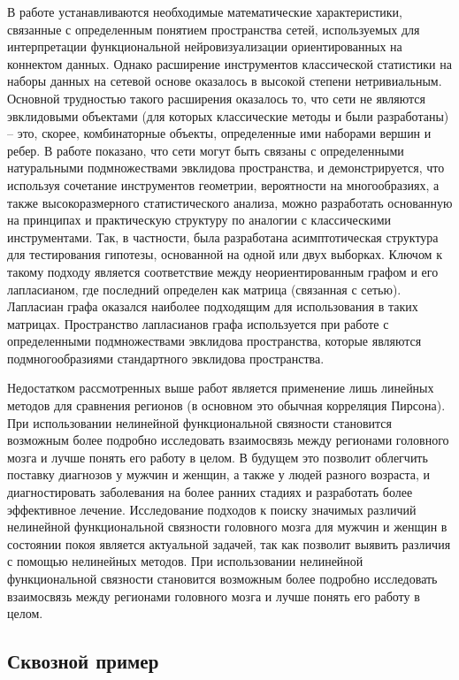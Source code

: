 В работе \cite{ginestet2017hypothesis} устанавливаются необходимые математические характеристики, связанные с определенным понятием пространства сетей, используемых для интерпретации функциональной нейровизуализации ориентированных на коннектом данных. Однако расширение инструментов классической статистики на наборы данных на сетевой основе оказалось в высокой степени нетривиальным. Основной трудностью такого расширения оказалось то, что сети не являются эвклидовыми объектами (для которых классические методы и были разработаны) – это, скорее, комбинаторные объекты, определенные ими наборами вершин и ребер. В работе \cite{ginestet2017hypothesis} показано, что сети могут быть связаны с определенными натуральными подмножествами эвклидова пространства, и демонстрируется, что используя сочетание инструментов геометрии, вероятности на многообразиях, а также высокоразмерного статистического анализа, можно разработать основанную на принципах и практическую структуру по аналогии с классическими инструментами. Так, в частности, была разработана асимптотическая структура для тестирования гипотезы, основанной на одной или двух выборках. Ключом к такому подходу является соответствие между неориентированным графом и его лапласианом, где последний определен как матрица (связанная с сетью). Лапласиан графа оказался наиболее подходящим для использования в таких матрицах. Пространство лапласианов графа используется при работе с определенными подмножествами эвклидова пространства, которые являются подмногообразиями стандартного эвклидова пространства.


Недостатком рассмотренных выше работ является применение лишь линейных методов для сравнения регионов (в основном это обычная корреляция Пирсона). При использовании нелинейной функциональной связности становится возможным более подробно исследовать взаимосвязь между регионами головного мозга и лучше понять его работу в целом. В будущем это позволит облегчить поставку диагнозов у мужчин и женщин, а также у людей разного возраста, и диагностировать заболевания на более ранних стадиях и разработать более эффективное лечение. Исследование подходов к поиску значимых различий нелинейной функциональной связности головного мозга для мужчин и женщин в состоянии покоя является актуальной задачей, так как позволит выявить различия с помощью нелинейных методов. При использовании нелинейной функциональной связности становится возможным более подробно исследовать взаимосвязь между регионами головного мозга и лучше понять его работу в целом.
\subsection{Сквозной пример}

